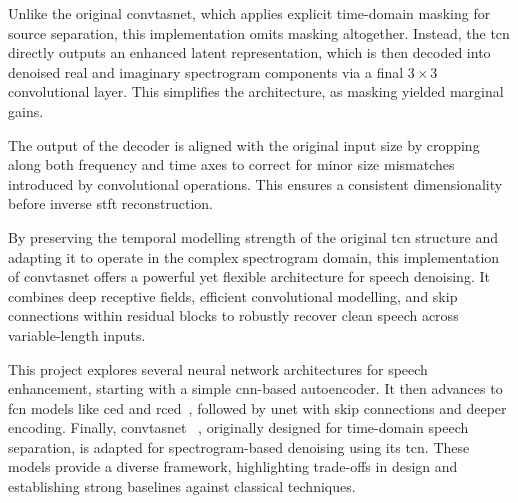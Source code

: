 Unlike the original \gls{convtasnet}, which applies explicit time-domain masking for source separation, this implementation omits masking altogether. Instead, the \gls{tcn} directly outputs an enhanced latent representation, which is then decoded into denoised real and imaginary spectrogram components via a final \(3 \times 3\) convolutional layer. This simplifies the architecture, as masking yielded marginal gains.

The output of the decoder is aligned with the original input size by cropping along both frequency and time axes to correct for minor size mismatches introduced by convolutional operations. This ensures a consistent dimensionality before inverse \gls{stft} reconstruction.

By preserving the temporal modelling strength of the original \gls{tcn} structure and adapting it to operate in the complex spectrogram domain, this implementation of \gls{convtasnet} offers a powerful yet flexible architecture for speech denoising. It combines deep receptive fields, efficient convolutional modelling, and skip connections within residual blocks to robustly recover clean speech across variable-length inputs.

\vspace{2em}

This project explores several neural network architectures for speech enhancement, starting with a simple \gls{cnn}-based autoencoder. It then advances to \gls{fcn} models like \gls{ced} and \gls{rced}~\cite{park2017acoustic}, followed by \gls{unet} with skip connections and deeper encoding. Finally, \gls{convtasnet} ~\cite{Luo2018ConvTasNetSI}, originally designed for time-domain speech separation, is adapted for spectrogram-based denoising using its \gls{tcn}. These models provide a diverse framework, highlighting trade-offs in design and establishing strong baselines against classical techniques.

